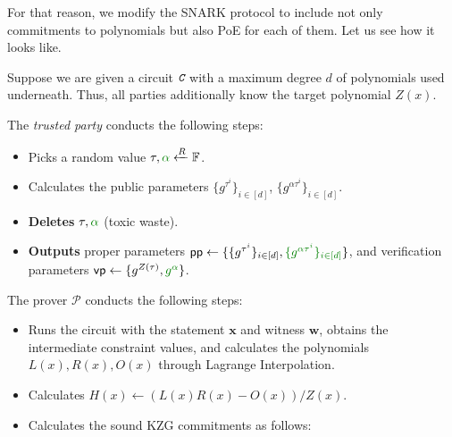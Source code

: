 \documentclass[../lecture-notes.tex]{subfiles}
\begin{document}
For that reason, we modify the SNARK protocol to include not only commitments to polynomials but also PoE for each of them. Let us see how it looks like.

\begin{tcolorbox}[breakable, title=Attempt \#2: SNARK with PoE included,
    colback=blue!5!white,
    colframe=blue!75!black,
    colbacktitle=blue!25!white,
    coltitle=blue!20!black,
    fonttitle=\bfseries,
    boxrule=1.25pt,
    subtitle style={boxrule=0pt,
    colback=blue!20!white,
    colupper=blue!75!gray} ]

    Suppose we are given a circuit $\textit{\texttt{C}}$ with a maximum degree $d$ of polynomials used underneath. Thus, all parties additionally know the target polynomial $Z(x)$.

    The \emph{trusted party} conducts the following steps:
    \begin{itemize}[label=, left=0mm]
        \item Picks a random value $\tau, \textcolor{green!50!black}{\alpha} \xleftarrow{R} \mathbb{F}$.
        \item Calculates the public parameters $\{g^{\tau^i}\}_{i \in [d]}$, \textcolor{green!50!black}{$\{g^{\alpha\tau^i}\}_{i \in [d]}$}.
        \item \textbf{Deletes} $\tau, \textcolor{green!50!black}{\alpha}$ (toxic waste).
        \item \textbf{Outputs} proper parameters $\mathsf{pp}\gets\{\{g^{\tau^i}\}_{i \in [d]}, \textcolor{green!50!black}{\{g^{\alpha\tau^i}\}_{i \in [d]}}\}$, and verification parameters $\mathsf{vp} \gets \{g^{Z(\tau)}, \textcolor{green!50!black}{g^{\alpha}}\}$.
    \end{itemize}
    The prover $\mathcal{P}$ conducts the following steps:
    \begin{itemize}[label=, left=0mm]
        \item Runs the circuit with the statement $\mathbf{x}$ and witness $\mathbf{w}$, obtains the intermediate constraint values, and calculates the polynomials $L(x), R(x), O(x)$ through Lagrange Interpolation.
        \item Calculates $H(x) \gets (L(x)R(x) - O(x))\big/ Z(x)$. 
        \item Calculates the sound KZG commitments as follows: \\
        \begin{align*}

\end{align*}
\end{itemize}
\end{tcolorbox}
\end{document}

